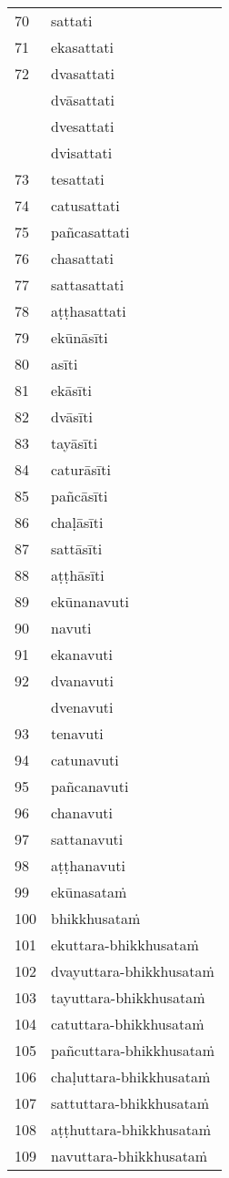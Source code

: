 \begin{multicols}{4}
\begin{supertabular}{l|l}
70	&	sattati\\
71	&	ekasattati\\
72	&	dvasattati\\
	&	dvāsattati\\
	&	dvesattati\\
	&	dvisattati\\
73	&	tesattati\\
74	&	catusattati\\
75	&	pañcasattati\\
76	&	chasattati\\
77	&	sattasattati\\
78	&	aṭṭhasattati\\
79	&	ekūnāsīti\\
80	&	asīti\\
81	&	ekāsīti\\
82	&	dvāsīti\\
83	&	tayāsīti\\
84	&	caturāsīti\\
85	&	pañcāsīti\\
86	&	chaḷāsīti\\
87	&	sattāsīti\\
88	&	aṭṭhāsīti\\
89	&	ekūnanavuti\\
90	&	navuti\\
91	&	ekanavuti\\
92	&	dvanavuti\\
	&	dvenavuti\\
93	&	tenavuti\\
94	&	catunavuti\\
95	&	pañcanavuti\\
96	&	chanavuti\\
97	&	sattanavuti\\
98	&	aṭṭhanavuti\\
99	&	ekūnasataṁ\\
100	&	bhikkhusataṁ\\
101	&	ekuttara-bhikkhusataṁ\\
102	&	dvayuttara-bhikkhusataṁ\\
103	&	tayuttara-bhikkhusataṁ\\
104	&	catuttara-bhikkhusataṁ\\
105	&	pañcuttara-bhikkhusataṁ\\
106	&	chaḷuttara-bhikkhusataṁ\\
107	&	sattuttara-bhikkhusataṁ\\
108	&	aṭṭhuttara-bhikkhusataṁ\\
109	&	navuttara-bhikkhusataṁ\\

\end{supertabular}
\end{multicols}

